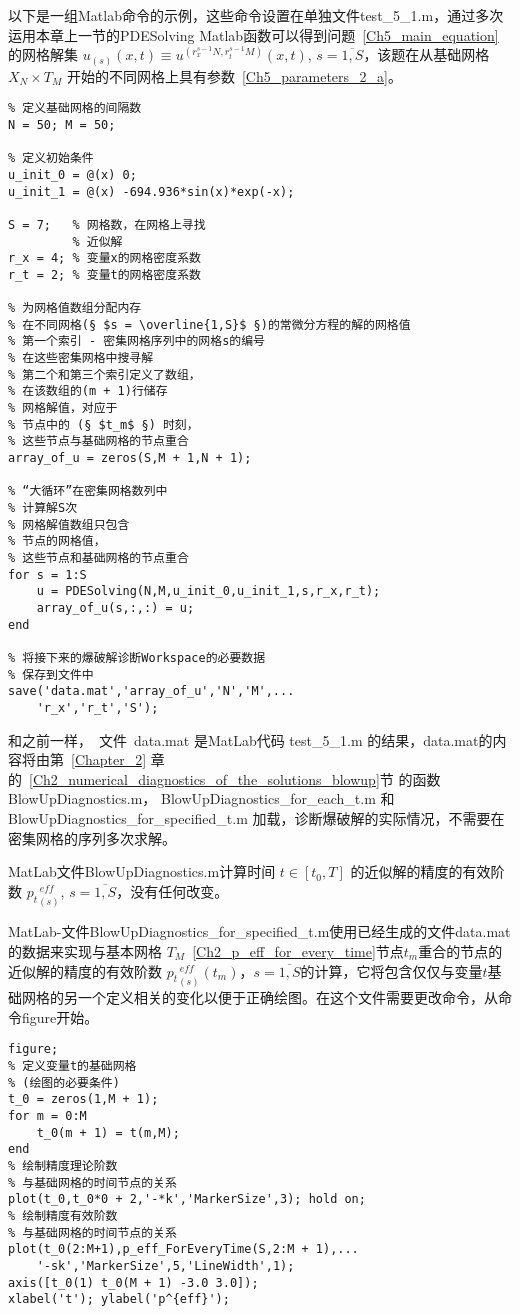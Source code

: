 \documentclass[twoside]{book}
\begin{document}
\begin{CJK*}{GBK}{song}
以下是一组Matlab命令的示例，这些命令设置在单独文件test\_5\_1.m，通过多次运用本章上一节的PDESolving Matlab函数可以得到问题~\eqref{Ch5_main_equation} 的网格解集 $u_{(s)}(x,t) \equiv u^{(r_x^{s - 1}N,r_t^{s - 1}M)}(x,t)$, $s = \overline{1,S}$，该题在从基础网格 $X_N \times T_M$ 开始的不同网格上具有参数~\eqref{Ch5_parameters_2_a}。

%
\begin{lstlisting}
% 定义基础网格的间隔数
N = 50; M = 50;

% 定义初始条件
u_init_0 = @(x) 0;
u_init_1 = @(x) -694.936*sin(x)*exp(-x);

S = 7;   % 网格数，在网格上寻找
         % 近似解
r_x = 4; % 变量x的网格密度系数
r_t = 2; % 变量t的网格密度系数

% 为网格值数组分配内存
% 在不同网格(§ $s = \overline{1,S}$ §)的常微分方程的解的网格值
% 第一个索引 - 密集网格序列中的网格s的编号
% 在这些密集网格中搜寻解
% 第二个和第三个索引定义了数组，
% 在该数组的(m + 1)行储存
% 网格解值，对应于
% 节点中的 (§ $t_m$ §) 时刻，
% 这些节点与基础网格的节点重合
array_of_u = zeros(S,M + 1,N + 1);

% “大循环”在密集网格数列中
% 计算解S次
% 网格解值数组只包含
% 节点的网格值，
% 这些节点和基础网格的节点重合
for s = 1:S
    u = PDESolving(N,M,u_init_0,u_init_1,s,r_x,r_t);
    array_of_u(s,:,:) = u;
end

% 将接下来的爆破解诊断Workspace的必要数据
% 保存到文件中
save('data.mat','array_of_u','N','M',...
    'r_x','r_t','S');
\end{lstlisting}

和之前一样，~文件~data.mat 是MatLab代码 test\_5\_1.m 的结果，data.mat的内容将由第~\ref{Chapter_2} 章的~\ref{Ch2_numerical_diagnostics_of_the_solutions_blowup}节 的函数 BlowUpDiagnostics.m， BlowUpDiagnostics\_for\_each\_t.m 和 BlowUpDiagnostics\_for\_specified\_t.m 加载，诊断爆破解的实际情况，不需要在密集网格的序列多次求解。


MatLab文件BlowUpDiagnostics.m计算时间 $t \in [t_0,T]$ 的近似解的精度的有效阶数 ${p_t}^{\, eff}_{(s)}$, $s = \overline{1,S}$，没有任何改变。

MatLab-文件BlowUpDiagnostics\_for\_specified\_t.m使用已经生成的文件data.mat的数据来实现与基本网格 $T_M$~\eqref{Ch2_p_eff_for_every_time}节点$t_m$重合的节点的近似解的精度的有效阶数 ${p_t}^{\, eff}_{(s)}(t_m)$，$s = \overline{1,S}$的计算，它将包含仅仅与变量$t$基础网格的另一个定义相关的变化以便于正确绘图。在这个文件需要更改命令，从命令figure开始。
%
\begin{lstlisting}
figure;
% 定义变量t的基础网格
% (绘图的必要条件)
t_0 = zeros(1,M + 1);
for m = 0:M
    t_0(m + 1) = t(m,M);
end
% 绘制精度理论阶数
% 与基础网格的时间节点的关系
plot(t_0,t_0*0 + 2,'-*k','MarkerSize',3); hold on;
% 绘制精度有效阶数
% 与基础网格的时间节点的关系
plot(t_0(2:M+1),p_eff_ForEveryTime(S,2:M + 1),...
    '-sk','MarkerSize',5,'LineWidth',1);
axis([t_0(1) t_0(M + 1) -3.0 3.0]);
xlabel('t'); ylabel('p^{eff}');
\end{lstlisting}


\end{CJK*}
\end{document}
